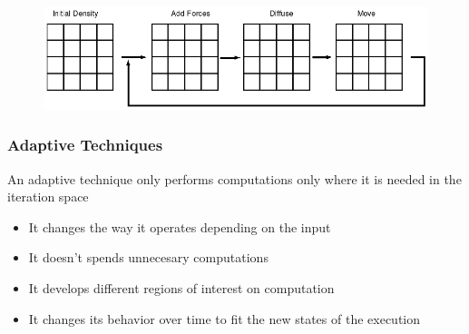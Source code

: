 \documentclass{beamer}\usetheme{Madrid} %
\begin{document}
\begin{frame}
\begin{columns}
\begin{figure}
\end{figure}
\end{columns}
\begin{figure}
        \includegraphics[scale=0.32]{img/eul2.png}
\end{figure}
\end{frame}
\begin{frame}
    \frametitle{Adaptive Techniques} An adaptive technique only performs computations only 
		where it is needed in the iteration space
			\begin{itemize}
						\item
							It changes the way it operates depending on the input
						\item
							It doesn't spends unnecesary computations
						\item
							It develops different regions of interest on computation
						\item
							It changes its behavior over time to fit the new states
							of the execution
    \end{itemize}
\end{frame}
\end{document}
